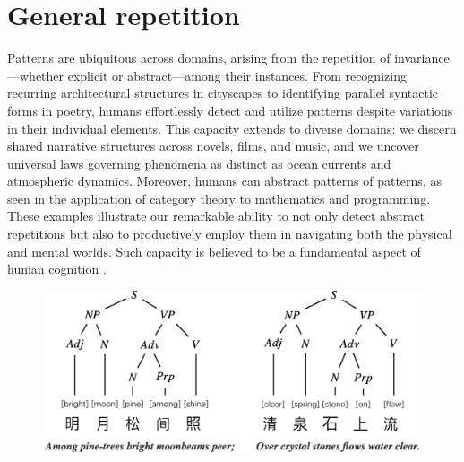 \documentclass[a4paper,11pt]{article}
\begin{document}
    \section{General repetition}

    Patterns are ubiquitous across domains, arising from the repetition of invariance—whether explicit or abstract—among their instances. 
    From recognizing recurring architectural structures in cityscapes to identifying parallel syntactic forms in poetry, humans effortlessly detect and utilize patterns despite variations in their individual elements. This capacity extends to diverse domains: we discern shared narrative structures across novels, films, and music, and we uncover universal laws governing phenomena as distinct as ocean currents and atmospheric dynamics.  
    Moreover, humans can abstract patterns of patterns, as seen in the application of category theory to mathematics and programming.
    These examples illustrate our remarkable ability to not only detect abstract repetitions but also to productively employ them in navigating both the physical and mental worlds.
    Such capacity is believed to be a fundamental aspect of human cognition \parencite{pomiechowska2024compositionality}.

    
    \begin{figure}
        \centering
        \includegraphics[width=0.9\linewidth]{figs/Chinese poem.png} 
        
        \caption{
        }
        \label{fig:poetry}
        
    \end{figure}
\end{document}
